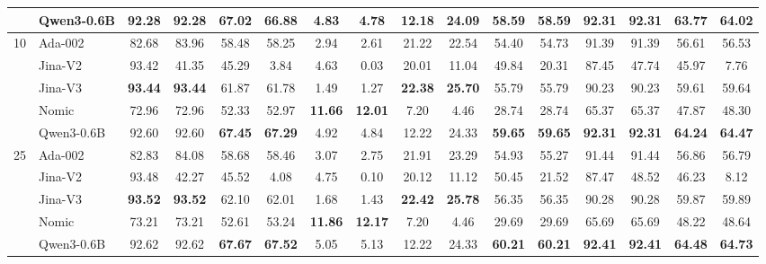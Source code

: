 \begin{sidewaystable}[htbp!]
\begin{tabular}{llcccccccccccccc}
& Qwen3-0.6B & 92.28 & 92.28 & \textbf{67.02} & \textbf{66.88} & 4.83 & 4.78 & 12.18 & \textbf{24.09} & \textbf{58.59} & \textbf{58.59} & \textbf{92.31} & \textbf{92.31} & \textbf{63.77} & \textbf{64.02} \\
\midrule
\multirow{5}{*}{10} & Ada-002 & 82.68 & 83.96 & 58.48 & 58.25 & 2.94 & 2.61 & 21.22 & 22.54 & 54.40 & 54.73 & 91.39 & 91.39 & 56.61 & 56.53 \\
& Jina-V2 & 93.42 & 41.35 & 45.29 & 3.84 & 4.63 & 0.03 & 20.01 & 11.04 & 49.84 & 20.31 & 87.45 & 47.74 & 45.97 & 7.76 \\
& Jina-V3 & \textbf{93.44} & \textbf{93.44} & 61.87 & 61.78 & 1.49 & 1.27 & \textbf{22.38} & \textbf{25.70} & 55.79 & 55.79 & 90.23 & 90.23 & 59.61 & 59.64 \\
& Nomic & 72.96 & 72.96 & 52.33 & 52.97 & \textbf{11.66} & \textbf{12.01} & 7.20 & 4.46 & 28.74 & 28.74 & 65.37 & 65.37 & 47.87 & 48.30 \\
& Qwen3-0.6B & 92.60 & 92.60 & \textbf{67.45} & \textbf{67.29} & 4.92 & 4.84 & 12.22 & 24.33 & \textbf{59.65} & \textbf{59.65} & \textbf{92.31} & \textbf{92.31} & \textbf{64.24} & \textbf{64.47} \\
\midrule
\multirow{5}{*}{25} & Ada-002 & 82.83 & 84.08 & 58.68 & 58.46 & 3.07 & 2.75 & 21.91 & 23.29 & 54.93 & 55.27 & 91.44 & 91.44 & 56.86 & 56.79 \\
& Jina-V2 & 93.48 & 42.27 & 45.52 & 4.08 & 4.75 & 0.10 & 20.12 & 11.12 & 50.45 & 21.52 & 87.47 & 48.52 & 46.23 & 8.12 \\
& Jina-V3 & \textbf{93.52} & \textbf{93.52} & 62.10 & 62.01 & 1.68 & 1.43 & \textbf{22.42} & \textbf{25.78} & 56.35 & 56.35 & 90.28 & 90.28 & 59.87 & 59.89 \\
& Nomic & 73.21 & 73.21 & 52.61 & 53.24 & \textbf{11.86} & \textbf{12.17} & 7.20 & 4.46 & 29.69 & 29.69 & 65.69 & 65.69 & 48.22 & 48.64 \\
& Qwen3-0.6B & 92.62 & 92.62 & \textbf{67.67} & \textbf{67.52} & 5.05 & 5.13 & 12.22 & 24.33 & \textbf{60.21} & \textbf{60.21} & \textbf{92.41} & \textbf{92.41} & \textbf{64.48} & \textbf{64.73} \\
\bottomrule
\end{tabular}
\end{sidewaystable}
\clearpage
